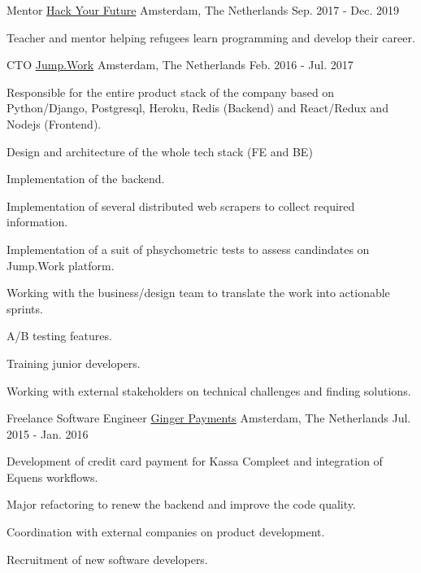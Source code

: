 \begin{cventries}
  \cventry
    {Mentor} %
    {\href{https://www.hackyourfuture.net}{Hack Your Future}} %
    {Amsterdam, The Netherlands} %
    {Sep. 2017 - Dec. 2019} %
    {
      \begin{cvitems} %
      \item {Teacher and mentor helping refugees learn programming and develop their career.}
      \end{cvitems}
    }

  \cventry
    {CTO} %
    {\href{https://www.jump.work/}{Jump.Work}} %
    {Amsterdam, The Netherlands} %
    {Feb. 2016 - Jul. 2017} %
    {
      \begin{cvitems} %
        \item {Responsible for the entire product stack of the company based on Python/Django, Postgresql, Heroku, Redis (Backend) and React/Redux and Nodejs (Frontend).}
        \item {Design and architecture of the whole tech stack (FE and BE)}
        \item {Implementation of the backend.}
        \item {Implementation of several distributed web scrapers to collect required information.}
        \item {Implementation of a suit of phsychometric tests to assess candindates on Jump.Work platform.}
        \item {Working with the business/design team to translate the work into actionable sprints.}
        \item {A/B testing features.}
        \item {Training junior developers.}
        \item {Working with external stakeholders on technical challenges and finding solutions.}
      \end{cvitems}
    }

  \cventry
    {Freelance Software Engineer} %
    {\href{https://www.gingerpayments.com}{Ginger Payments}} %
    {Amsterdam, The Netherlands} %
    {Jul. 2015 - Jan. 2016} %
    {
      \begin{cvitems} %
      \item {Development of credit card payment for Kassa Compleet and integration of Equens workflows.}
      \item {Major refactoring to renew the backend and improve the code quality.}
      \item {Coordination with external companies on product development.}
      \item {Recruitment of new software developers.}
      \end{cvitems}
    }



\end{cventries}
